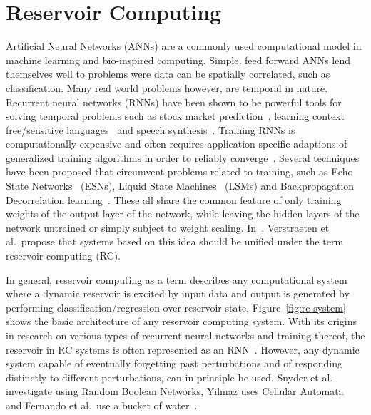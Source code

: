 \clearpage

\section{Reservoir Computing}

Artificial Neural Networks (ANNs) are a commonly used computational model in
machine learning and bio-inspired computing. Simple, feed forward ANNs lend
themselves well to problems were data can be spatially correlated, such as
classification. Many real world problems however, are temporal in nature.
Recurrent neural networks (RNNs) have been shown to be powerful tools for
solving temporal problems such as stock market prediction~\cite{Lawrence2001},
learning context free/sensitive languages~\cite{Gers2001} and speech
synthesis~\cite{Wu2016}. Training RNNs is computationally expensive and often
requires application specific adaptions of generalized training algorithms in
order to reliably converge~\cite{Hammer2002}. Several techniques have been
proposed that circumvent problems related to training, such as Echo State
Networks~\cite{Jaeger2001} (ESNs), Liquid State Machines~\cite{Maass2002} (LSMs)
and Backpropagation Decorrelation learning~\cite{Steil2004}. These all share the
common feature of only training weights of the output layer of the network,
while leaving the hidden layers of the network untrained or simply subject to
weight scaling. In~\cite{Verstraeten2007}, Verstraeten et al.\ propose that
systems based on this idea should be unified under the term reservoir computing
(RC).

In general, reservoir computing as a term describes any computational system
where a dynamic reservoir is excited by input data and output is generated by
performing classification/regression over reservoir state.
Figure~\ref{fig:rc-system} shows the basic architecture of any reservoir
computing system. With its origins in research on various types of recurrent
neural networks and training thereof, the reservoir in RC systems is often
represented as an RNN~\cite{Verstraeten2007}. However, any dynamic system
capable of eventually forgetting past perturbations and of responding distinctly
to different perturbations, can in principle be used. Snyder et
al.~\cite{Snyder2013} investigate using Random Boolean Networks, Yilmaz uses
Cellular Automata~\cite{Yilmaz2014} and Fernando et al.\ use a bucket of
water~\cite{Fernando2003}.

